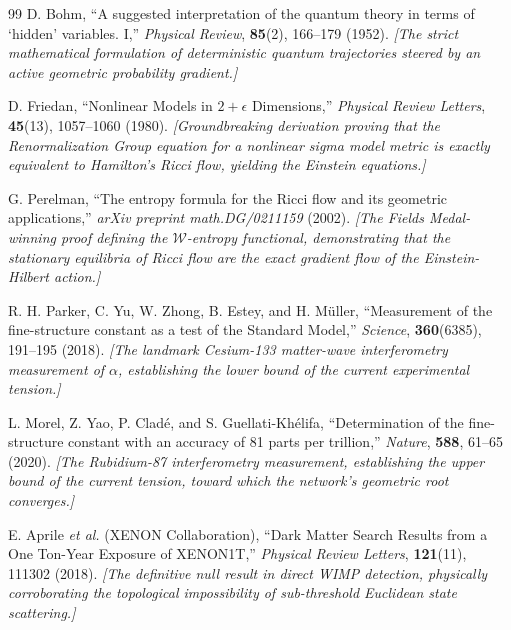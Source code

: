 \documentclass[11pt, letterpaper]{article}
\theoremstyle{definition}
\theoremstyle{remark}
\begin{document}
\begin{thebibliography}{99}
D. Bohm,
``A suggested interpretation of the quantum theory in terms of `hidden' variables. I,''
\textit{Physical Review}, \textbf{85}(2), 166--179 (1952).
\newblock \textit{[The strict mathematical formulation of deterministic quantum trajectories steered by an active geometric probability gradient.]}

D. Friedan,
``Nonlinear Models in $2+\epsilon$ Dimensions,''
\textit{Physical Review Letters}, \textbf{45}(13), 1057--1060 (1980).
\newblock \textit{[Groundbreaking derivation proving that the Renormalization Group equation for a nonlinear sigma model metric is exactly equivalent to Hamilton's Ricci flow, yielding the Einstein equations.]}

G. Perelman,
``The entropy formula for the Ricci flow and its geometric applications,''
\textit{arXiv preprint math.DG/0211159} (2002).
\newblock \textit{[The Fields Medal-winning proof defining the $\mathcal{W}$-entropy functional, demonstrating that the stationary equilibria of Ricci flow are the exact gradient flow of the Einstein-Hilbert action.]}

R. H. Parker, C. Yu, W. Zhong, B. Estey, and H. M\"uller,
``Measurement of the fine-structure constant as a test of the Standard Model,''
\textit{Science}, \textbf{360}(6385), 191--195 (2018).
\newblock \textit{[The landmark Cesium-133 matter-wave interferometry measurement of $\alpha$, establishing the lower bound of the current experimental tension.]}

L. Morel, Z. Yao, P. Clad\'e, and S. Guellati-Kh\'elifa,
``Determination of the fine-structure constant with an accuracy of 81 parts per trillion,''
\textit{Nature}, \textbf{588}, 61--65 (2020).
\newblock \textit{[The Rubidium-87 interferometry measurement, establishing the upper bound of the current tension, toward which the network's geometric root converges.]}

E. Aprile \textit{et al.} (XENON Collaboration),
``Dark Matter Search Results from a One Ton-Year Exposure of XENON1T,''
\textit{Physical Review Letters}, \textbf{121}(11), 111302 (2018).
\newblock \textit{[The definitive null result in direct WIMP detection, physically corroborating the topological impossibility of sub-threshold Euclidean state scattering.]}

\end{thebibliography}
\end{document}
